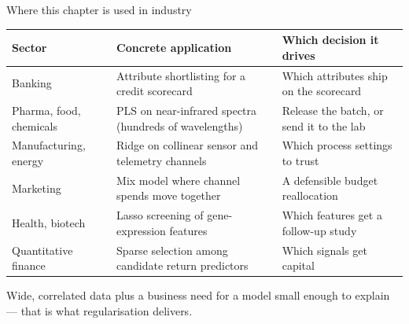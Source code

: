 \documentclass[aspectratio=169,11pt]{beamer}
\begin{document}
\begin{frame}{Where this chapter is used in industry}
  \scriptsize
  \begin{center}
  \begin{tabular}{@{}p{2.9cm}p{4.9cm}p{4.4cm}@{}}
    \toprule
    \textbf{Sector} & \textbf{Concrete application} & \textbf{Which decision it drives} \\
    \midrule
    Banking &
      Attribute shortlisting for a credit \mbox{scorecard} &
      Which attributes ship on the scorecard \\
    Pharma, food, chemicals &
      PLS on near-infrared spectra (hundreds of wavelengths) &
      Release the batch, or send it to the lab \\
    Manufacturing, energy &
      Ridge on collinear sensor and telemetry channels &
      Which process settings to trust \\
    Marketing &
      Mix model where channel spends move together &
      A defensible budget reallocation \\
    Health, biotech &
      Lasso screening of gene-expression features &
      Which features get a follow-up study \\
    Quantitative finance &
      Sparse selection among candidate return predictors &
      Which signals get capital \\
    \bottomrule
  \end{tabular}
  \end{center}
  \begin{industry}
    Wide, correlated data plus a business need for a model small enough to
    explain --- that is what regularisation delivers.
  \end{industry}
\end{frame}
\end{document}
